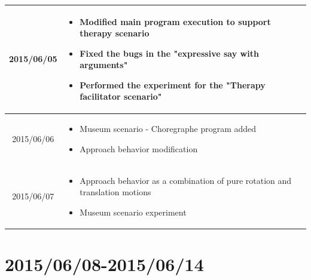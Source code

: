 \documentclass[11pt]{article} %
\begin{document}
\begin{center}
\begin{longtable}{ | c | p{6cm} | p{5cm} |}
  2015/06/05         & 
  \begin{itemize}
  \item Modified main program execution to support therapy scenario 
  \item Fixed the bugs in the "expressive say with arguments"
  \item Performed the experiment for the "Therapy facilitator scenario"
\end{itemize}   
  & 
\\
  										 \hline
  										 
  2015/06/06         & 
  \begin{itemize}
  \item Museum scenario - Choregraphe program added
  \item Approach behavior modification
\end{itemize}   
  & 
\\
  										 \hline			
  										 
  	2015/06/07         & 
  \begin{itemize}
  \item Approach behavior as a combination of pure rotation and translation motions
  \item Museum scenario experiment
\end{itemize}   
  & 
\\
  										 \hline										 							 
  										   								 
    \end{longtable}
\end{center}

\newpage
\section{2015/06/08-2015/06/14}
\end{document}
